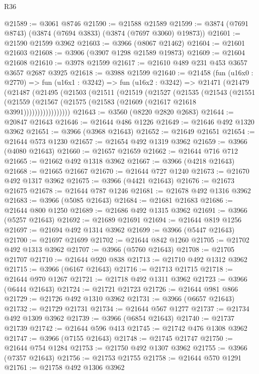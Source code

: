 \begin{lexlean}{R36}
\begin{coremodule}
@21589 := @3061 @8746
@21590 := @21588 @21589
@21599 := @3874 (@7691 @8743) (@3874 (@7694 @3833) (@3874 (@7697 @3060) @19873))
@21601 := @21590 @21599 @3962
@21603 := @3966 (@8067 @21462)
@21604 := @21601 @21603
@21608 := @3906 (@3907 @1298 @21589 @19873)
@21609 := @21604 @21608
@21610 := @3978 @21599
@21617 := @21610 @489 @231 @453 @3657 @3657 @2687 @3925
@21618 := @3988 @21599
@21640 := @21458
    (fun (u16x0 : @2770) =>
    fun (u16x1 : @3242) =>
    fun (u16x2 : @3242) =>
    @21471
      (@21479
        (@21487
          (@21495
            (@21503
              (@21511
                (@21519
                  (@21527
                    (@21535
                      (@21543
                        (@21551
                          (@21559
                            (@21567 (@21575 (@21583 (@21609 (@21617 @21618 @3991)))))))))))))))))
@21643 := @3560 (@8220 @2820 @2683)
@21644 := @20847 @21643
@21646 := @21644 @486 @1226
@21649 := @21646 @492 @1320 @3962
@21651 := @3966 (@3968 @21643)
@21652 := @21649 @21651
@21654 := @21644 @573 @1230
@21657 := @21654 @492 @1319 @3962
@21659 := @3966 (@4080 @21643)
@21660 := @21657 @21659
@21662 := @21644 @716 @712
@21665 := @21662 @492 @1318 @3962
@21667 := @3966 (@4218 @21643)
@21668 := @21665 @21667
@21670 := @21644 @727 @1240
@21673 := @21670 @492 @1317 @3962
@21675 := @3966 (@4421 @21643)
@21676 := @21673 @21675
@21678 := @21644 @787 @1246
@21681 := @21678 @492 @1316 @3962
@21683 := @3966 (@5085 @21643)
@21684 := @21681 @21683
@21686 := @21644 @800 @1250
@21689 := @21686 @492 @1315 @3962
@21691 := @3966 (@5257 @21643)
@21692 := @21689 @21691
@21694 := @21644 @819 @1256
@21697 := @21694 @492 @1314 @3962
@21699 := @3966 (@5447 @21643)
@21700 := @21697 @21699
@21702 := @21644 @842 @1260
@21705 := @21702 @492 @1313 @3962
@21707 := @3966 (@5760 @21643)
@21708 := @21705 @21707
@21710 := @21644 @920 @838
@21713 := @21710 @492 @1312 @3962
@21715 := @3966 (@6167 @21643)
@21716 := @21713 @21715
@21718 := @21644 @970 @1267
@21721 := @21718 @492 @1311 @3962
@21723 := @3966 (@6444 @21643)
@21724 := @21721 @21723
@21726 := @21644 @981 @866
@21729 := @21726 @492 @1310 @3962
@21731 := @3966 (@6657 @21643)
@21732 := @21729 @21731
@21734 := @21644 @567 @1277
@21737 := @21734 @492 @1309 @3962
@21739 := @3966 (@6854 @21643)
@21740 := @21737 @21739
@21742 := @21644 @596 @413
@21745 := @21742 @476 @1308 @3962
@21747 := @3966 (@7155 @21643)
@21748 := @21745 @21747
@21750 := @21644 @754 @1284
@21753 := @21750 @492 @1307 @3962
@21755 := @3966 (@7357 @21643)
@21756 := @21753 @21755
@21758 := @21644 @570 @1291
@21761 := @21758 @492 @1306 @3962

\end{coremodule}
\end{lexlean}
